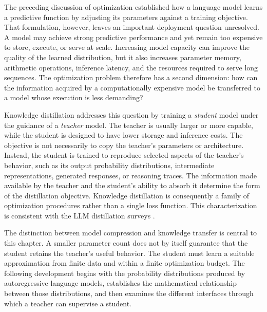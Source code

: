 
The preceding discussion of optimization established how a language model
learns a predictive function by adjusting its parameters against a training
objective.  That formulation, however, leaves an important deployment
question unresolved.  A model may achieve strong predictive performance and
yet remain too expensive to store, execute, or serve at scale.  Increasing
model capacity can improve the quality of the learned distribution, but it
also increases parameter memory, arithmetic operations, inference latency,
and the resources required to serve long sequences.  The optimization problem
therefore has a second dimension: how can the information acquired by a
computationally expensive model be transferred to a model whose execution is
less demanding?

Knowledge distillation addresses this question by training a \emph{student}
model under the guidance of a \emph{teacher} model.  The teacher is usually
larger or more capable, while the student is designed to have lower storage
and inference costs.  The objective is not necessarily to copy the teacher's
parameters or architecture.  Instead, the student is trained to reproduce
selected aspects of the teacher's behavior, such as its output probability
distributions, intermediate representations, generated responses, or
reasoning traces.  The information made available by the teacher and the
student's ability to absorb it determine the form of the distillation
objective.  Knowledge distillation is consequently a family of optimization
procedures rather than a single loss function.  This characterization is
consistent with the LLM distillation surveys
\parencite{Yang2024SurveyKD,Fang2026KnowledgeDatasetDistillation}.

The distinction between model compression and knowledge transfer is central
to this chapter.  A smaller parameter count does not by itself guarantee that
the student retains the teacher's useful behavior.  The student must learn a
suitable approximation from finite data and within a finite optimization
budget.  The following development begins with the probability distributions
produced by autoregressive language models, establishes the mathematical
relationship between those distributions, and then examines the different
interfaces through which a teacher can supervise a student.


